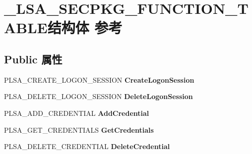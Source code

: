 \hypertarget{struct___l_s_a___s_e_c_p_k_g___f_u_n_c_t_i_o_n___t_a_b_l_e}{}\section{\+\_\+\+L\+S\+A\+\_\+\+S\+E\+C\+P\+K\+G\+\_\+\+F\+U\+N\+C\+T\+I\+O\+N\+\_\+\+T\+A\+B\+L\+E结构体 参考}
\label{struct___l_s_a___s_e_c_p_k_g___f_u_n_c_t_i_o_n___t_a_b_l_e}
\subsection*{Public 属性}
\begin{DoxyCompactItemize}
\item 
\mbox{\label{struct___l_s_a___s_e_c_p_k_g___f_u_n_c_t_i_o_n___t_a_b_l_e_a74a312c4f391aaff4bd9770bf573bd31}} 
P\+L\+S\+A\+\_\+\+C\+R\+E\+A\+T\+E\+\_\+\+L\+O\+G\+O\+N\+\_\+\+S\+E\+S\+S\+I\+ON {\bfseries Create\+Logon\+Session}
\item 
\mbox{\label{struct___l_s_a___s_e_c_p_k_g___f_u_n_c_t_i_o_n___t_a_b_l_e_a95c313edac53b8db08931700077d9754}} 
P\+L\+S\+A\+\_\+\+D\+E\+L\+E\+T\+E\+\_\+\+L\+O\+G\+O\+N\+\_\+\+S\+E\+S\+S\+I\+ON {\bfseries Delete\+Logon\+Session}
\item 
\mbox{\label{struct___l_s_a___s_e_c_p_k_g___f_u_n_c_t_i_o_n___t_a_b_l_e_a4eaad9c738878b1a544c9615abbfef1c}} 
P\+L\+S\+A\+\_\+\+A\+D\+D\+\_\+\+C\+R\+E\+D\+E\+N\+T\+I\+AL {\bfseries Add\+Credential}
\item 
\mbox{\label{struct___l_s_a___s_e_c_p_k_g___f_u_n_c_t_i_o_n___t_a_b_l_e_a91faa4be4f20adb86d44c949f41b0005}} 
P\+L\+S\+A\+\_\+\+G\+E\+T\+\_\+\+C\+R\+E\+D\+E\+N\+T\+I\+A\+LS {\bfseries Get\+Credentials}
\item 
\mbox{\label{struct___l_s_a___s_e_c_p_k_g___f_u_n_c_t_i_o_n___t_a_b_l_e_a211ee697d375cd2c8a70ca4253b4108a}} 
P\+L\+S\+A\+\_\+\+D\+E\+L\+E\+T\+E\+\_\+\+C\+R\+E\+D\+E\+N\+T\+I\+AL {\bfseries Delete\+Credential}

\end{DoxyCompactItemize}
